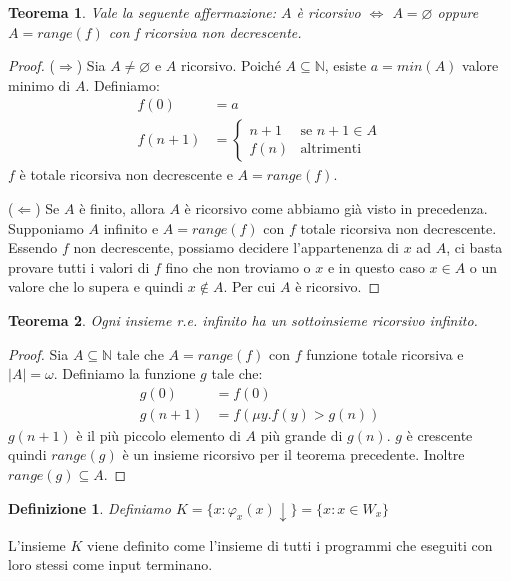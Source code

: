 \documentclass[a4paper,titlepage]{article}
\newtheorem{theorem}{Teorema}[section]
\newtheorem{definition}{Definizione}[section]
\theoremstyle{definition}
\newcommand{\N}{\mathbb{N}}
\begin{document}
\begin{theorem}
	Vale la seguente affermazione: $A$ è ricorsivo $\iff$ $A=\varnothing$ oppure $A=range(f)$ con f ricorsiva non decrescente.
\end{theorem}
\begin{proof}
	($\Rightarrow$) Sia $A\neq\varnothing$ e $A$ ricorsivo. Poiché $A\subseteq\N$, esiste $a = min(A)$ valore minimo di $A$. Definiamo:	
	\[
		\begin{aligned}
			f(0) &= a\\
			f(n+1) &=
			\begin{cases}
				n+1 &\text{se } n+1\in A\\
				f(n) &\text{altrimenti}
			\end{cases}
		\end{aligned}
	\]
	$f$ è totale ricorsiva non decrescente e $A=range(f)$.
	
	($\Leftarrow$) Se $A$ è finito, allora $A$ è ricorsivo come abbiamo già visto in precedenza. Supponiamo $A$ infinito e $A=range(f)$ con $f$ totale ricorsiva non decrescente. Essendo $f$ non decrescente, possiamo decidere l'appartenenza di $x$ ad $A$, ci basta provare tutti i valori di $f$ fino che non troviamo o $x$ e in questo caso $x\in A$ o un valore che lo supera e quindi $x\notin A$. Per cui $A$ è ricorsivo.  
\end{proof}

\begin{theorem}
	Ogni insieme r.e. infinito ha un sottoinsieme ricorsivo infinito. 
\end{theorem}
\begin{proof}
	Sia $A\subseteq\N$ tale che $A=range(f)$ con $f$ funzione totale ricorsiva e $|A|=\omega$. Definiamo la funzione $g$ tale che:
	\[
		\begin{aligned}
			g(0) &= f(0)\\
			g(n+1)&=f(\mu y. f(y) >g(n))
		\end{aligned}
	\]
	$g(n+1)$ è il più piccolo elemento di $A$ più grande di $g(n)$. $g$ è crescente quindi $range(g)$ è un insieme ricorsivo per il teorema precedente. Inoltre $range(g)\subseteq A$.
\end{proof}

\begin{definition}
	Definiamo $K=\{x:\varphi_x(x)\downarrow\} =\{x:x\in W_x\}$
\end{definition}

L'insieme $K$ viene definito come l'insieme di tutti i programmi che eseguiti con loro stessi come input terminano. 
\end{document}
